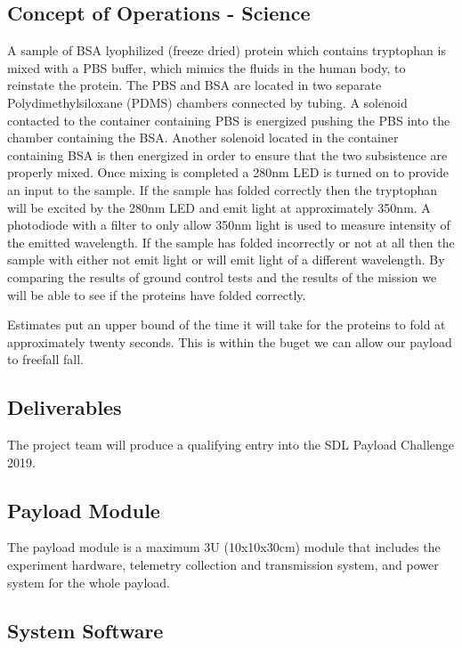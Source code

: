 \documentclass[conference]{IEEEtran} %
\begin{document}
\subsection{Concept of Operations - Science}
\label{subsec:operations}
A sample of BSA lyophilized (freeze dried) protein which contains tryptophan is mixed with a PBS buffer, which mimics the fluids in the human body, to reinstate the protein. The PBS and BSA are located in two separate Polydimethylsiloxane (PDMS) chambers connected by tubing. A solenoid contacted to the container containing PBS is energized pushing the PBS into the chamber containing the BSA. Another solenoid located in the container containing BSA is then energized in order to ensure that the two subsistence are properly mixed. Once mixing is completed a 280nm LED is turned on to provide an input to the sample. If the sample has folded correctly then the tryptophan will be excited by the 280nm LED and emit light at approximately 350nm. A photodiode with a filter to only allow 350nm light is used to measure intensity of the emitted wavelength. If the sample has folded incorrectly or not at all then the sample with either not emit light or will emit light of a different wavelength. By comparing the results of ground control tests and the results of the mission we will be able to see if the proteins have folded correctly.

Estimates put an upper bound of the time it will take for the proteins to fold at approximately twenty seconds. This is within the buget we can allow our payload to freefall fall. 

\subsection{Deliverables}
\label{subsec:deliverables}
The project team will produce a qualifying entry into the SDL Payload Challenge 2019. 

\subsection{Payload Module}
\label{subsec:payload}
The payload module is a maximum 3U (10x10x30cm) module that includes the experiment hardware, telemetry collection and transmission system, and power system for the whole payload.

\subsection{System Software}
\label{subsec:sysware}
\end{document}
